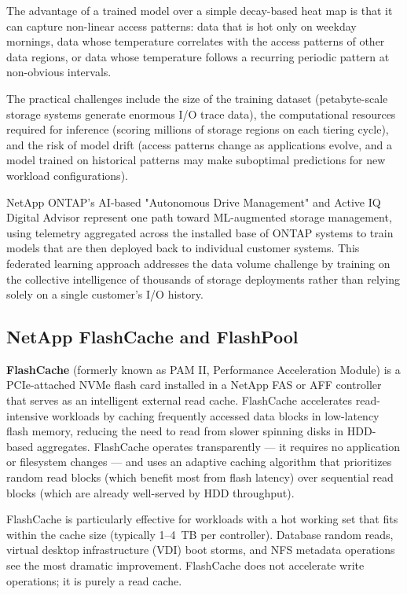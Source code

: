 The advantage of a trained model over a simple decay-based heat map is that it can capture non-linear access patterns: data that is hot only on weekday mornings, data whose temperature correlates with the access patterns of other data regions, or data whose temperature follows a recurring periodic pattern at non-obvious intervals.

The practical challenges include the size of the training dataset (petabyte-scale storage systems generate enormous I/O trace data), the computational resources required for inference (scoring millions of storage regions on each tiering cycle), and the risk of model drift (access patterns change as applications evolve, and a model trained on historical patterns may make suboptimal predictions for new workload configurations).

NetApp ONTAP's AI-based "Autonomous Drive Management" and Active IQ Digital Advisor represent one path toward ML-augmented storage management, using telemetry aggregated across the installed base of ONTAP systems to train models that are then deployed back to individual customer systems. This federated learning approach addresses the data volume challenge by training on the collective intelligence of thousands of storage deployments rather than relying solely on a single customer's I/O history.


\subsection{NetApp FlashCache and FlashPool}

\textbf{FlashCache} (formerly known as PAM II, Performance Acceleration Module) is a PCIe-attached NVMe flash card installed in a NetApp FAS or AFF controller that serves as an intelligent external read cache. FlashCache accelerates read-intensive workloads by caching frequently accessed data blocks in low-latency flash memory, reducing the need to read from slower spinning disks in HDD-based aggregates. FlashCache operates transparently --- it requires no application or filesystem changes --- and uses an adaptive caching algorithm that prioritizes random read blocks (which benefit most from flash latency) over sequential read blocks (which are already well-served by HDD throughput).

FlashCache is particularly effective for workloads with a hot working set that fits within the cache size (typically 1--4~TB per controller). Database random reads, virtual desktop infrastructure (VDI) boot storms, and NFS metadata operations see the most dramatic improvement. FlashCache does not accelerate write operations; it is purely a read cache.

